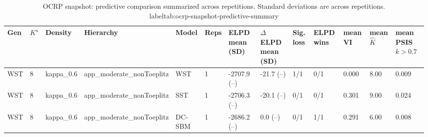 \begin{table}[!h]
\centering
\caption{OCRP snapshot: predictive comparison summarized across repetitions. Standard deviations are across repetitions.\\label{tab:ocrp-snapshot-predictive-summary}}
\centering
\begin{tabular}[t]{lllllllllllll}
\toprule
Gen & $K^\star$ & Density & Hierarchy & Model & Reps & ELPD mean (SD) & $\Delta$ELPD mean (SD) & Sig. loss & ELPD wins & mean VI & mean $\hat K$ & mean PSIS $k>0.7$\\
\midrule
WST & 8 & kappa_0.6 & app_moderate_nonToeplitz & WST & 1 & -2707.9 (--) & -21.7 (--) & 1/1 & 0/1 & 0.000 & 8.00 & 0.009\\
WST & 8 & kappa_0.6 & app_moderate_nonToeplitz & SST & 1 & -2706.3 (--) & -20.1 (--) & 0/1 & 0/1 & 0.301 & 9.00 & 0.024\\
WST & 8 & kappa_0.6 & app_moderate_nonToeplitz & DC-SBM & 1 & -2686.2 (--) & 0.0 (--) & 0/1 & 1/1 & 0.291 & 6.00 & 0.008\\
\bottomrule
\end{tabular}
\end{table}
